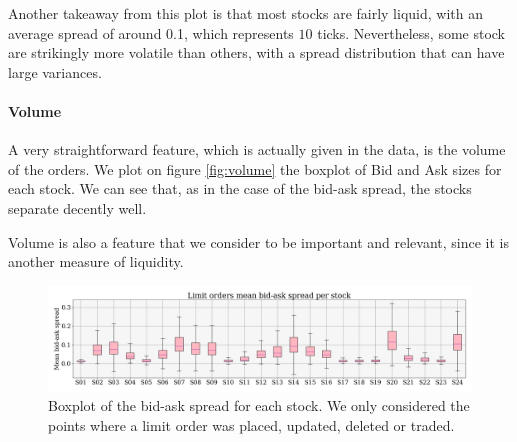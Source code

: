 \documentclass[switch, 11pt]{article}
\begin{document}
\begin{multicols}{2}
    Another takeaway from this plot is that most stocks are fairly liquid, with an average spread of around 0.1, which represents $10$ ticks. Nevertheless, some stock are strikingly more volatile than others, with a spread distribution that can have large variances.

    \paragraph{Volume}
    A very straightforward feature, which is actually given in the data, is the volume of the orders. We plot on figure \ref{fig:volume} the boxplot of Bid and Ask sizes for each stock. We can see that, as in the case of the bid-ask spread, the stocks separate decently well.

    Volume is also a feature that we consider to be important and relevant, since it is another measure of liquidity.

\end{multicols}
\begin{figure}
    \centering
    \includegraphics[width=\columnwidth]{figures/mean_spread_per_stock_mo.png}
    \caption{Boxplot of the bid-ask spread for each stock. We only considered the points where a limit order was placed, updated, deleted or traded.}
    \label{fig:spread}
\end{figure}
\end{document}
